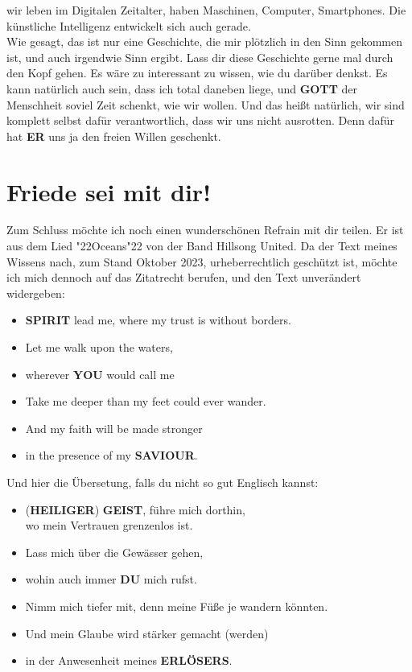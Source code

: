\documentclass[10pt,a5paper]{article}
\newcommand{\Du}[0]{\textbf{DU}}
\newcommand{\Erloesers}[0]{\textbf{ERL\"OSERS}}
\newcommand{\Er}[0]{\textbf{ER}}
\newcommand{\Geist}[0]{\textbf{GEIST}}
\newcommand{\Gott}[0]{\textbf{GOTT}}
\newcommand{\Heiliger}[0]{\textbf{HEILIGER}}
\newcommand{\Saviour}[0]{\textbf{SAVIOUR}}
\newcommand{\Spirit}[0]{\textbf{SPIRIT}}
\newcommand{\You}[0]{\textbf{YOU}}
\newcommand{\q}[1]{\char"22{#1}\char"22 }
\begin{document}
		wir leben im Digitalen Zeitalter,
		haben Maschinen,
		Computer,
		Smartphones.
		Die k\"unstliche Intelligenz entwickelt sich auch gerade.
		\\
		Wie gesagt,
		das ist nur eine Geschichte,
		die mir pl\"otzlich in den Sinn gekommen ist,
		und auch irgendwie Sinn ergibt.
		Lass dir diese Geschichte gerne mal durch den Kopf gehen.
		Es w\"are zu interessant zu wissen,
		wie du dar\"uber denkst.
		Es kann nat\"urlich auch sein,
		dass ich total daneben liege,
		und {\Gott} der Menschheit soviel Zeit schenkt,
		wie wir wollen.
		Und das hei{\ss}t nat\"urlich,
		wir sind komplett selbst daf\"ur verantwortlich,
		dass wir uns nicht ausrotten.
		Denn daf\"ur hat {\Er} uns ja den freien Willen geschenkt.
		
	\newpage
	\section{Friede sei mit dir!}
		Zum Schluss m\"ochte ich noch einen wundersch\"onen Refrain mit dir teilen.
		Er ist aus dem Lied \q{Oceans} von der Band Hillsong United.
		Da der Text meines Wissens nach,
		zum Stand Oktober 2023,
		urheberrechtlich gesch\"utzt ist,
		m\"ochte ich mich dennoch auf das Zitatrecht berufen,
		und den Text unver\"andert widergeben:
		\\	
		\begin{itemize}[nosep]
			\item[]	{\Spirit} lead me,
					where my trust is without borders.
			\item[] Let me walk upon the waters,
			\item[] wherever {\You} would call me
			\item[]	Take me deeper than my feet could ever wander.
			\item[]	And my faith will be made stronger
			\item[]	in the presence of my {\Saviour}.
			\\
		\end{itemize}
		Und hier die \"Ubersetung,
		falls du nicht so gut Englisch kannst:
		\\
		\begin{itemize}[nosep]
			\item[]	({\Heiliger}) {\Geist},
					f\"uhre mich dorthin,
					\\
					wo mein Vertrauen grenzenlos ist.
			\item[]	Lass mich \"uber die Gew\"asser gehen,
			\item[] wohin auch immer {\Du} mich rufst.
			\item[]	Nimm mich tiefer mit,
					denn meine F\"u{\ss}e je wandern k\"onnten.
			\item[]	Und mein Glaube wird st\"arker gemacht (werden)
			\item[]	in der Anwesenheit meines {\Erloesers}.
			\\
		\end{itemize}
\end{document}
